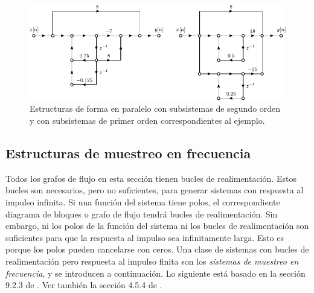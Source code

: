 \documentclass[a4paper]{report}
\begin{document}
\begin{figure}[!htb]
 \begin{center}
 \includegraphics[width=\textwidth]{figuras/structures_example_06_06_flow_graph.pdf}
 \caption{\label{fig:structures_example_06_06_flow_graph} Estructuras de forma en paralelo con subsistemas de segundo orden y con subsistemas de primer orden correspondientes al ejemplo.}
 \end{center}
\end{figure}

\subsection{Estructuras de muestreo en frecuencia} 
 
Todos los grafos de flujo en esta sección tienen bucles de realimentación. Estos bucles son necesarios, pero no suficientes, para generar sistemas con respuesta al impulso infinita. Si una función del sistema tiene polos, el correspondiente diagrama de bloques o grafo de flujo tendrá bucles de realimentación. Sin embargo, ni los polos de la función del sistema ni los bucles de realimentación son suficientes para que la respuesta al impulso sea infinitamente larga. Esto es porque los polos pueden cancelarse con ceros. Una clase de sistemas con bucles de realimentación pero respuesta al impulso finita son los \emph{sistemas de muestreo en frecuencia}, y se introducen a continuación. Lo siguiente está basado en la sección 9.2.3 de \cite{proakis06digital}. Ver también la sección 4.5.4 de \cite{oppenheim75digital}.
\end{document}
